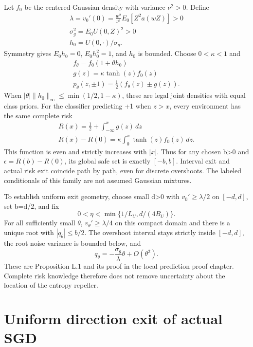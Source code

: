 Let \(f_0\) be the centered Gaussian density with variance \(\nu^2>0\). Define
\[
\begin{gathered}
\lambda=v_0'(0)=\frac{w^2}{\nu^2}E_0[Z^2a(wZ)]>0 \\
\sigma_g^2=E_0U(0,Z)^2>0 \\
h_0=U(0,\cdot)/\sigma_g.
\end{gathered}
\]
Symmetry gives \(E_0h_0=0\), \(E_0h_0^2=1\), and \(h_0\) is bounded. Choose \(0<\kappa<1\) and
\[
\begin{gathered}
f_\theta=f_0(1+\theta h_0) \\
g(z)=\kappa\tanh(z)f_0(z) \\
p_\theta(z,\pm1)=\tfrac12(f_\theta(z)\pm g(z)).
\end{gathered}
\]
When \(|\theta|\|h_0\|_\infty\le\min(1/2,1-\kappa)\), these are legal joint densities with equal class priors. For the classifier predicting +1 when \(z>x\), every environment has the same complete risk
\[
\begin{gathered}
R(x)=\tfrac12+\int_{-\infty}^x g(z)\,dz \\
R(x)-R(0)=\kappa\int_0^x\tanh(z)f_0(z)\,dz.
\end{gathered}
\]
This function is even and strictly increases with \(|x|\). Thus for any chosen b\textgreater0 and \(\epsilon=R(b)-R(0)\), its global safe set is exactly \([-b,b]\). Interval exit and actual risk exit coincide path by path, even for discrete overshoots. The labeled conditionals of this family are not assumed Gaussian mixtures.

To establish uniform exit geometry, choose small d\textgreater0 with \(v_0'\ge\lambda/2\) on \([-d,d]\), set b=d/2, and fix
\[
0<\eta<\min\{1/L_U,d/(4B_U)\}.
\]
For all sufficiently small \textbar{}\(\theta\)\textbar, \(v_\theta'\ge\lambda/4\) on this compact domain and there is a unique root with \(|q_\theta|\le b/2\). The overshoot interval stays strictly inside \([-d,d]\), the root noise variance is bounded below, and
\[
q_\theta=-\frac{\sigma_g}{\lambda}\theta+O(\theta^2).
\]
These are Proposition L.1 and its proof in the local prediction proof chapter. Complete risk knowledge therefore does not remove uncertainty about the location of the entropy repeller.

\section{Uniform direction exit of actual SGD}\label{uniform-direction-exit-of-actual-sgd}

